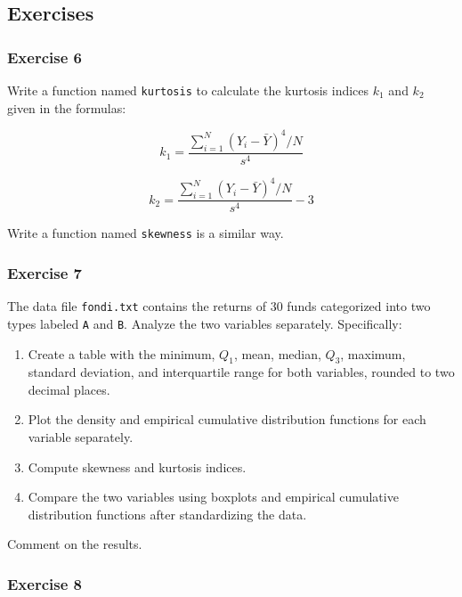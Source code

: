 \documentclass[
]{article}
\providecommand{\tightlist}{%
  \setlength{\itemsep}{0pt}\setlength{\parskip}{0pt}}
\begin{document}
\hypertarget{exercises}{%
\subsection{Exercises}\label{exercises}}

\hypertarget{exercise-6}{%
\subsubsection{Exercise 6}\label{exercise-6}}

Write a function named \texttt{kurtosis} to calculate the kurtosis
indices \(k_1\) and \(k_2\) given in the formulas:

\[
k_1 = \frac{\sum_{i=1}^N (Y_i - \bar{Y})^4 / N}{s^4}
\]

\[
k_2 = \frac{\sum_{i=1}^N (Y_i - \bar{Y})^4 / N}{s^4} - 3
\]

Write a function named \texttt{skewness} is a similar way.

\hypertarget{exercise-7}{%
\subsubsection{Exercise 7}\label{exercise-7}}

The data file \texttt{fondi.txt} contains the returns of 30 funds
categorized into two types labeled \texttt{A} and \texttt{B}. Analyze
the two variables separately. Specifically:

\begin{enumerate}
\def\labelenumi{\arabic{enumi}.}
\tightlist
\item
  Create a table with the minimum, \(Q_1\), mean, median, \(Q_3\),
  maximum, standard deviation, and interquartile range for both
  variables, rounded to two decimal places.
\item
  Plot the density and empirical cumulative distribution functions for
  each variable separately.
\item
  Compute skewness and kurtosis indices.
\item
  Compare the two variables using boxplots and empirical cumulative
  distribution functions after standardizing the data.
\end{enumerate}

Comment on the results.

\hypertarget{exercise-8}{%
\subsubsection{Exercise 8}\label{exercise-8}}
\end{document}

